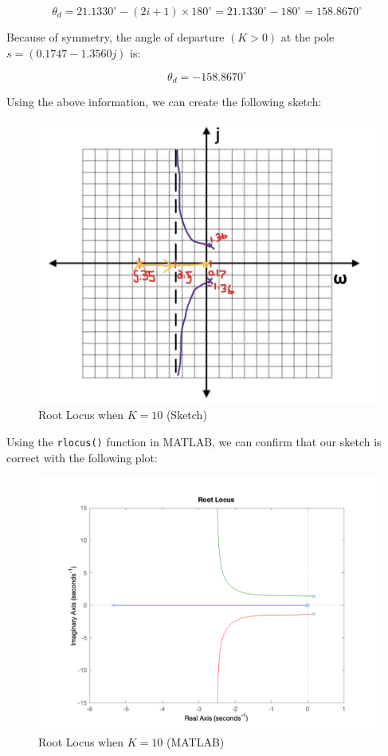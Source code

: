 \documentclass[12pt, letterpaper]{../assignment}
\begin{document}
$$ \theta_d = 21.1330^{\circ} - (2i+1)\times 180^{\circ} = 21.1330^{\circ} -180^{\circ}  = 158.8670^{\circ} $$

Because of symmetry, the angle of departure $(K > 0)$ at the pole $s = (0.1747 - 1.3560j)$ is:

$$ \theta_d = -158.8670^{\circ} $$

Using the above information, we can create the following sketch:

\begin{figure}[H]
    \centering
    \includegraphics[width=0.5\linewidth]{./figures/Q2_sketch_2.png}
    \caption{Root Locus when $K = 10$ (Sketch)}
    \label{fig:step}
\end{figure}

Using the \texttt{rlocus()} function in MATLAB, we can confirm that our sketch is correct with the following plot:

\begin{figure}[H]
    \centering
    \includegraphics[width=0.7\linewidth]{./figures/Q2b_MATLAB_rootLocus.png}
    \caption{Root Locus when $K = 10$ (MATLAB)}
    \label{fig:step}
\end{figure}

\end{document}
